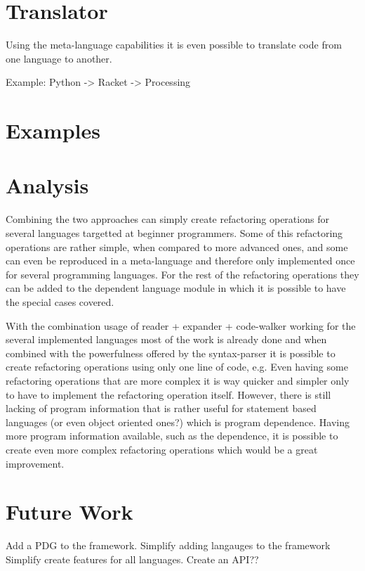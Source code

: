 \section{Translator}
Using the meta-language capabilities it is even possible to translate code
from one language to another.

Example: Python -> Racket -> Processing
\section{Examples}  %

\section{Analysis} %
Combining the two approaches can simply create refactoring operations for several
languages targetted at beginner programmers. Some of this refactoring operations
are rather simple, when compared to more advanced ones, and some can even be reproduced
in a meta-language and therefore only implemented once for several programming languages.
For the rest of the refactoring operations they can be added to the dependent language
module in which it is possible to have the special cases covered.

With the combination usage of reader + expander + code-walker working for the several
implemented languages most of the work is already done and when combined with the
powerfulness offered by the syntax-parser it is possible to create refactoring operations
using only one line of code, e.g. %
Even having some refactoring operations that are more complex it is way quicker and
simpler only to have to implement the refactoring operation itself.
However, there is still lacking of program information that is rather useful for
statement based languages (or even object oriented ones?) which is program dependence.
Having more program information available, such as the dependence, it is possible to
create even more complex refactoring operations which would be a great improvement.



\section{Future Work}
Add a PDG to the framework.
Simplify adding langauges to the framework
Simplify create features for all languages.
Create an API??
